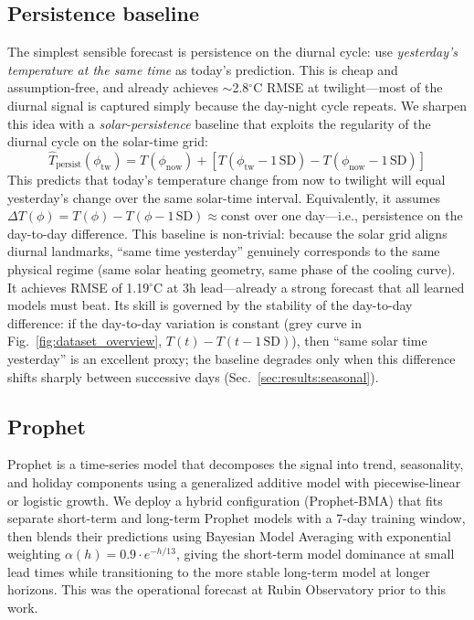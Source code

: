 \documentclass[]{spie}  %
\newcommand{\degC}{$^{\circ}$C}
\begin{document}
\subsection{Persistence baseline}
\label{sec:methods:persistence}

The simplest sensible forecast is persistence on the diurnal cycle: use \emph{yesterday's temperature at the same time} as today's prediction. This is cheap and assumption-free, and already achieves $\sim$2.8\degC{} RMSE at twilight---most of the diurnal signal is captured simply because the day-night cycle repeats. We sharpen this idea with a \emph{solar-persistence} baseline that exploits the regularity of the diurnal cycle on the solar-time grid:
\begin{equation}
\hat{T}_{\text{persist}}(\phi_{\text{tw}}) = T(\phi_{\text{now}}) + \left[ T(\phi_{\text{tw}} - 1\,\text{SD}) - T(\phi_{\text{now}} - 1\,\text{SD}) \right]
\label{eq:persistence}
\end{equation}
This predicts that today's temperature change from now to twilight will equal yesterday's change over the same solar-time interval. Equivalently, it assumes $\Delta T(\phi) = T(\phi) - T(\phi - 1\,\text{SD}) \approx \text{const}$ over one day---i.e., persistence on the day-to-day difference. This baseline is non-trivial: because the solar grid aligns diurnal landmarks, ``same time yesterday'' genuinely corresponds to the same physical regime (same solar heating geometry, same phase of the cooling curve). It achieves RMSE of 1.19\degC{} at 3h lead---already a strong forecast that all learned models must beat. Its skill is governed by the stability of the day-to-day difference: if the day-to-day variation is constant (grey curve in Fig.~\ref{fig:dataset_overview}, $T(t)-T(t-1\,\text{SD})$), then ``same solar time yesterday'' is an excellent proxy; the baseline degrades only when this difference shifts sharply between successive days (Sec.~\ref{sec:results:seasonal}).

\subsection{Prophet}
\label{sec:methods:prophet}

Prophet\cite{Taylor2017} is a time-series model that decomposes the signal into trend, seasonality, and holiday components using a generalized additive model with piecewise-linear or logistic growth. We deploy a hybrid configuration (Prophet-BMA) that fits separate short-term and long-term Prophet models with a 7-day training window, then blends their predictions using Bayesian Model Averaging with exponential weighting $\alpha(h) = 0.9 \cdot e^{-h/13}$, giving the short-term model dominance at small lead times while transitioning to the more stable long-term model at longer horizons. This was the operational forecast at Rubin Observatory prior to this work.
\end{document}
